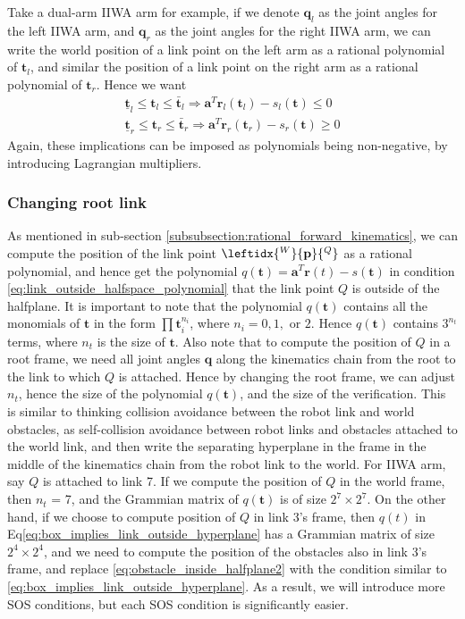 \documentclass{article}
\renewcommand{\vec}[1]{\mathbf{#1}}
\begin{document}
Take a dual-arm IIWA arm for example, if we denote $\vec{q}_l$ as the joint angles for the left IIWA arm, and $\vec{q}_r$ as the joint angles for the right IIWA arm, we can write the world position of a link point on the left arm as a rational polynomial of $\vec{t}_l$, and similar the position of a link point on the right arm as a rational polynomial of $\vec{t}_r$. Hence we want
\begin{align}
	\underline{\vec{t}}_l\le \vec{t}_l \le \bar{\vec{t}}_l\Rightarrow \vec{a}^T\vec{r}_l(\vec{t}_l) - s_l(\vec{t})\le 0\\
	\underline{\vec{t}}_r\le \vec{t}_r \le \bar{\vec{t}}_r\Rightarrow \vec{a}^T\vec{r}_r(\vec{t}_r) - s_r(\vec{t})\ge 0
\end{align}
Again, these implications can be imposed as polynomials being non-negative, by introducing Lagrangian multipliers.
\subsubsection{Changing root link}
As mentioned in sub-section \ref{subsubsection:rational_forward_kinematics}, we can compute the position of the link point $\leftidx{^W}{\vec{p}}{^Q}$ as a rational polynomial, and hence get the polynomial $q(\vec{t}) = \vec{a}^T\vec{r}(t)-s(\vec{t})$ in condition \eqref{eq:link_outside_halfspace_polynomial} that the link point $Q$ is outside of the halfplane. It is important to note that the polynomial $q(\vec{t})$ contains all the monomials of $\vec{t}$ in the form $\prod \vec{t}_i^{n_i}$, where $n_i = 0, 1, \text{ or } 2$. Hence $q(\vec{t})$ contains $3^{n_t}$ terms, where $n_t$ is the size of $\vec{t}$. Also note that to compute the position of $Q$ in a root frame, we need all joint angles $\vec{q}$ along the kinematics chain from the root to the link to which $Q$ is attached. Hence by changing the root frame, we can adjust $n_t$, hence the size of the polynomial $q(\vec{t})$, and the size of the verification. This is similar to thinking collision avoidance between the robot link and world obstacles, as self-collision avoidance between robot links and obstacles attached to the world link, and then write the separating hyperplane in the frame in the middle of the kinematics chain from the robot link to the world. For IIWA arm, say $Q$ is attached to link 7. If we compute the position of $Q$ in the world frame, then $n_t$ = 7, and the Grammian matrix of $q(\vec{t})$ is of size $2^7 \times 2^7$. On the other hand, if we choose to compute position of $Q$ in link 3's frame, then $q(t)$ in Eq\eqref{eq:box_implies_link_outside_hyperplane} has a Grammian matrix of size $2^4 \times 2^4$, and we need to compute the position of the obstacles also in link 3's frame, and replace \eqref{eq:obstacle_inside_halfplane2} with the condition similar to \eqref{eq:box_implies_link_outside_hyperplane}. As a result, we will introduce more SOS conditions, but each SOS condition is significantly easier.
\end{document}
